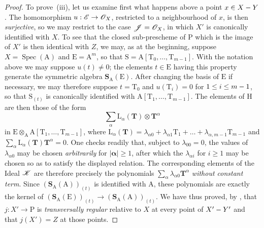 \begin{proof}
To prove~(iii), let us examine first what happens above a point $x\in X- Y$.
The homomorphism $u:\mathscr{E}\to\mathscr{O}_X$, restricted to a neighbourhood of $x$, is then \emph{surjective}, so we may restrict to the case $\mathscr{J}=\mathscr{O}_X$, in which $X'$ is canonically identified with $X$.
To see that the closed sub-prescheme of $\mathrm{P}$ which is the image of $X'$ is then identical with $Z$, we may, as at the beginning, suppose $X=\operatorname{Spec}(\mathrm{A})$ and $\mathrm{E}=\mathrm{A}^m$, so that $\mathrm{S}=\mathrm{A}[\mathrm{T}_0,\ldots,\mathrm{T}_{m-1}]$.
With the notation above we may suppose $u(t)\ne0$; the elements $t\in\mathrm{E}$ having this property generate the symmetric algebra $\mathbf{S}_\mathrm{A}(\mathrm{E})$.
After changing the basis of $\mathrm{E}$ if necessary, we may therefore suppose $t=\mathrm{T}_0$ and $u(\mathrm{T}_i)=0$ for $1\leq i\leq m- 1$, so that $\mathrm{S}_{(t)}$ is canonically identified with $\mathrm{A}[\mathrm{T}_1,\ldots,\mathrm{T}_{m-1}]$.
The elements of $\mathrm{H}$ are then those of the form
\[
  \sum_\alpha \mathrm{L}_\alpha(\mathbf{T})\otimes\mathbf{T}^\alpha
\]
in $\mathrm{E}\otimes_\mathrm{A}\mathrm{A}[\mathrm{T}_1,\ldots,\mathrm{T}_{m-1}]$, where
$\mathrm{L}_\alpha(\mathbf{T})=\lambda_{\alpha0}+\lambda_{\alpha1}\mathrm{T}_1+\ldots+\lambda_{\alpha,m-1}\mathrm{T}_{m-1}$ and
$\sum_\alpha\mathrm{L}_\alpha(\mathbf{T})\mathbf{T}^\alpha=0$.
One checks readily that, subject to $\lambda_{00}=0$, the values of $\lambda_{\alpha0}$ may be chosen \emph{arbitrarily} for $|\boldsymbol{\alpha}|\geq1$, after which the $\lambda_{\alpha i}$ for $i\geq1$ may be chosen so as to satisfy the displayed relation.
The corresponding elements of the Ideal $\mathscr{K}$ are therefore precisely the polynomials
$\sum_\alpha\lambda_{\alpha0}\mathbf{T}^\alpha$ \emph{without constant term}.
Since $(\mathbf{S}_\mathrm{A}(\mathrm{A}))_{(t)}$ is identified with $\mathrm{A}$, these polynomials are exactly the kernel of
$(\mathbf{S}_\mathrm{A}(\mathrm{E}))_{(t)}\to(\mathbf{S}_\mathrm{A}(\mathrm{A}))_{(t)}$.
We have thus proved, by , that $j:X'\to\mathrm{P}$ is \emph{transversally regular} relative to $X$ at every point of $X'- Y'$ and that $j(X')=Z$ at those points.


\end{proof}
